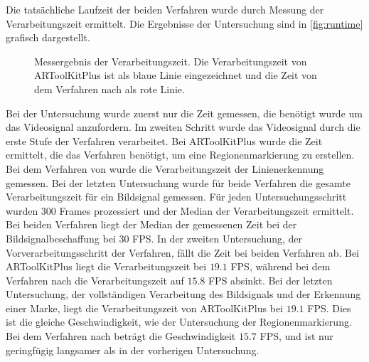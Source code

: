 Die tatsächliche Laufzeit der beiden Verfahren wurde durch Messung der Verarbeitungszeit ermittelt. Die Ergebnisse der Untersuchung sind in \autoref{fig:runtime} grafisch dargestellt.
\begin{figure}[!ht]
	\centering
	
	\caption{Messergebnis der Verarbeitungszeit. Die Verarbeitungszeit von ARToolKitPlus ist als blaue Linie
	 eingezeichnet und die Zeit von dem Verfahren nach \citeauthor{hirzer08} als rote Linie.}
	\label{fig:runtime}
\end{figure}
 Bei der Untersuchung wurde zuerst nur die Zeit gemessen, die benötigt wurde um das Videosignal anzufordern. Im zweiten
 Schritt wurde das Videosignal durch die erste Stufe der Verfahren verarbeitet. Bei ARToolKitPlus wurde die Zeit
 ermittelt, die das Verfahren  benötigt, um eine Regionenmarkierung zu erstellen. Bei dem
 Verfahren von \citeauthor{hirzer08} wurde die Verarbeitungszeit der Linienerkennung gemessen. Bei der letzten
 Untersuchung wurde für beide Verfahren die gesamte Verarbeitungszeit für ein Bildsignal gemessen. Für jeden
 Untersuchungsschritt wurden $300$ Frames prozessiert und der Median der Verarbeitungszeit ermittelt. Bei beiden
 Verfahren liegt der Median der gemessenen Zeit bei der Bildsignalbeschaffung bei $30$ FPS. In der zweiten
 Untersuchung, der Vorverarbeitungsschritt der Verfahren, fällt die Zeit bei beiden Verfahren ab. Bei ARToolKitPlus
 liegt die Verarbeitungszeit bei $19.1$ FPS, während bei dem Verfahren nach \citeauthor{hirzer08} die Verarbeitungszeit
 auf $15.8$ FPS absinkt. Bei der letzten Untersuchung, der vollständigen Verarbeitung des Bildsignals und der Erkennung
 einer Marke, liegt die Verarbeitungszeit von ARToolKitPlus bei $19.1$ FPS. Dies ist die gleiche Geschwindigkeit, wie
 der Untersuchung der Regionenmarkierung. Bei dem Verfahren nach \citeauthor{hirzer08} beträgt die Geschwindigkeit
 $15.7$ FPS, und ist nur geringfügig langsamer als in der vorherigen Untersuchung.

